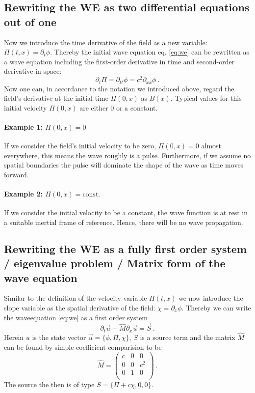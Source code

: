 \subsection{Rewriting the WE as two differential equations out of one}
Now we introduce the time derivative of the field as a new variable: $\Pi (t,x) = \partial_t \phi$. Thereby the initial wave equation eq. \ref{eq:we} can be rewritten as a wave equation including the first-order derivative in time and second-order derivative in space:
\begin{equation}
	\partial_t \Pi = \partial_{tt} \phi =  c^2 \partial_{xx}\phi ~.
\end{equation}
Now one can, in accordance to the notation we introduced above, regard the field's derivative at the initial time $\Pi(0,x)$ as $B(x)$.
Typical values for this initial velocity $\Pi (0,x)$ are either 0 or a constant.

\paragraph{Example 1: $\Pi(0,x) = 0$}
If we consider the field's initial velocity to be zero, $\Pi(0,x) = 0$ almost everywhere, this means the wave roughly is a pulse. Furthermore, if we assume no spatial boundaries the pulse will dominate the shape of the wave as time moves forward.
\paragraph{Example 2: $\Pi(0,x) = \text{const.}$}
If we consider the initial velocity to be a constant, the wave function is at rest in a suitable inertial frame of reference. Hence, there will be no wave propagation.



\subsection{Rewriting the WE as a fully first order system / eigenvalue problem / Matrix form of the wave equation}

Similar to the definition of the velocity variable $\Pi(t,x)$ we now introduce the slope variable as the spatial derivative of the field: $\chi = \partial_x \phi$.
Thereby we can write the waveequation \ref{eq:we} as a first order system
\begin{equation}
	\partial_t \vec{u} + \hat{M} \partial_x \vec{u} = \vec{S} ~.
	\label{eq:we-matrix}
\end{equation}
Herein $u$ is the state vector $\vec{u} = \{ \phi, \Pi , \chi \}$, $S$ is a source term and the matrix $\hat{M}$ can be found by simple coefficient comparision to be
\[
\hat{M} = \begin{pmatrix}
		c & 0 & 0 \\
		0 & 0 & c^2 \\
		0 & 1 & 0 \\
	\end{pmatrix}~. \]
The source the then is of type $S = \{\Pi + c \chi,0,0 \}$.

